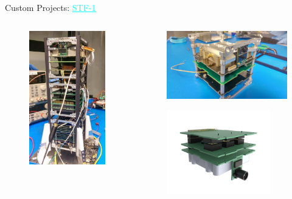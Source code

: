 \begin{frame}{Custom Projects: \href{http://stf1.com/}{\textcolor{cyan}{\underline{STF-1}}}}

    \begin{columns}[t]
        \begin{column}[t]{0.4\textwidth}
            \begin{figure}[!ht]
                \begin{center}
                    \includegraphics[width=3.5cm]{figures/stf1_integration-2.jpg}
                \end{center}
            \end{figure}
        \end{column}
        \begin{column}[t]{0.6\textwidth}
            \begin{figure}[!ht]
                \begin{center}
                    \includegraphics[width=5.5cm]{figures/stf1_stack_top-1024x579.jpg}
                \end{center}
            \end{figure}
            \begin{figure}[!ht]
                \begin{center}
                    \includegraphics[width=4.5cm]{figures/stf1_bottom_cube.png}
                \end{center}
            \end{figure}
        \end{column}
    \end{columns}

\end{frame}


